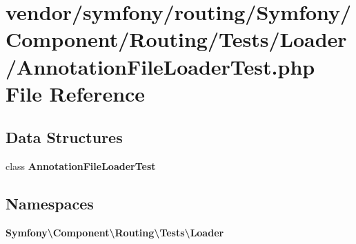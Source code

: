 \section{vendor/symfony/routing/\+Symfony/\+Component/\+Routing/\+Tests/\+Loader/\+Annotation\+File\+Loader\+Test.php File Reference}
\label{_annotation_file_loader_test_8php}
\subsection*{Data Structures}
\begin{DoxyCompactItemize}
\item 
class {\bf Annotation\+File\+Loader\+Test}
\end{DoxyCompactItemize}
\subsection*{Namespaces}
\begin{DoxyCompactItemize}
\item 
 {\bf Symfony\textbackslash{}\+Component\textbackslash{}\+Routing\textbackslash{}\+Tests\textbackslash{}\+Loader}
\end{DoxyCompactItemize}
